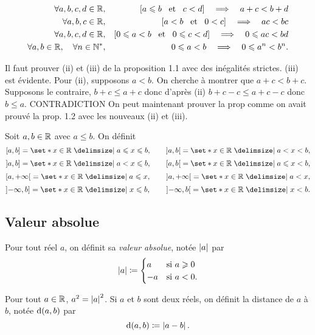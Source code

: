 \documentclass{magnoliaold}
\begin{document}
\begin{proposition}
\begin{eqnarray*}
\forall a,b,c,d\in\mathbb{R}, & & \left[a\leqslant b \quad\!\text{et}\quad\! c< d\right]\quad\Longrightarrow\quad
       a+c< b+d\\
\forall a,b,c\in\mathbb{R}, & & \left[a< b \quad\!\text{et}\quad\! 0< c\right]\quad\Longrightarrow\quad ac< bc\\
\forall a,b,c,d\in\mathbb{R}, & & \left[0\leqslant a< b \quad\!\text{et}\quad\! 0\leqslant c< d\right]\quad\Longrightarrow\quad
       0\leqslant ac< bd\\
\forall a,b\in\mathbb{R}, \quad \forall n\in{\mathbb{N}^*}, & & 0\leqslant a< b \quad\Longrightarrow\quad
  0\leqslant a^n< b^n.
\end{eqnarray*}
\end{proposition}

\begin{preuve}
Il faut prouver (ii) et (iii) de la proposition 1.1 avec des inégalités strictes.
(iii) est évidente.
Pour (ii), supposons $a<b$. On cherche à montrer que $a+c<b+c$. Supposons le contraire, $b+c\leq a+c$ donc d'après (ii) $b+c-c\leq a+c-c$ donc $b\leq a$. CONTRADICTION
On peut maintenant prouver la prop comme on avait prouvé la prop. 1.2 avec les nouveaux (ii) et (iii).
\end{preuve}


\begin{definition}[utile=-3]
Soit $a,b\in\mathbb{R}$ avec $a\leq b$. On définit
\[\interf{a}{b}=\enstq{x\in\R}{a\leq x\leq b}, \qquad
  \intero{a}{b}=\enstq{x\in\R}{a< x< b},\]
\[\interof{a}{b}=\enstq{x\in\R}{a< x\leq b}, \qquad
  \interfo{a}{b}=\enstq{x\in\R}{a\leq x< b},\]
\[\interfo{a}{+\infty}=\enstq{x\in\R}{a\leq x}, \qquad
  \intero{a}{+\infty}=\enstq{x\in\R}{a< x},\]
\[\interof{-\infty}{b}=\enstq{x\in\R}{x\leq b}, \qquad
  \intero{-\infty}{b}=\enstq{x\in\R}{x< b}.\]
\end{definition}

\subsection{Valeur absolue}

\begin{definition}[utile=-3]
Pour tout réel $a$, on définit sa \emph{valeur absolue}, notée $\left|a\right|$ par
  \[\left|a\right|\coloneqq
    \begin{cases}
    a  & \text{si $a\geqslant 0$}\\
    -a & \text{si $a<0$.}
    \end{cases}\]
\end{definition}

\begin{remarques}
\remarque Pour tout $a\in\mathbb{R}$, $a^2=\left|a\right|^2$.
\remarque Si $a$ et $b$ sont deux réels, on définit la distance de $a$ à $b$,
  notée ${\rm d}\!\left(a,b\right)$ par
  \[{\rm d}\!\left(a,b\right)\coloneqq\left|a-b\right|.\]
\end{remarques}
\end{document}
